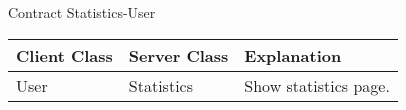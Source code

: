\begin{subsubsection}{Contract Statistics-User}
	\begin{tabular}{l l l }
	  Client Class & Server Class & Explanation\\ \hline
	  User & Statistics & Show statistics page.
	\end{tabular}
\end{subsubsection}
